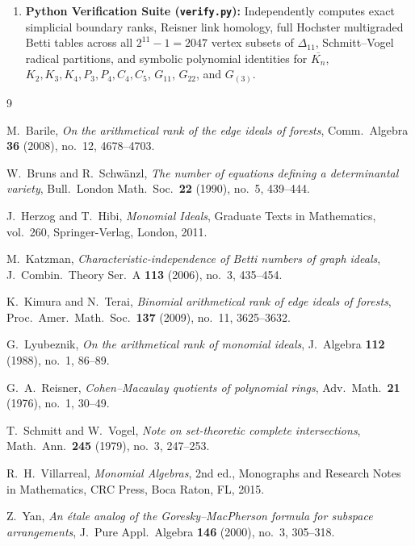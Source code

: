 \documentclass[11pt,a4paper]{amsart}
\theoremstyle{plain}
\theoremstyle{definition}
\newcommand{\FF}{\mathbb{F}}
\begin{document}
{\begin{enumerate}
\begin{itemize}
\begin{itemize}
      \item \texttt{disproof\_over\_F2} (concrete field instantiation on $\FF_2$ confirming hypothesis non-vacuity).
    \end{itemize}
  \end{itemize}
  \item[(2)] \textbf{Python Verification Suite (\texttt{verify.py}):} Independently computes exact simplicial boundary ranks, Reisner link homology, full Hochster multigraded Betti tables across all $2^{11}-1 = 2047$ vertex subsets of $\Delta_{11}$, Schmitt--Vogel radical partitions, and symbolic polynomial identities for $\overline{K_n}$, $K_2, K_3, K_4, P_3, P_4, C_4, C_5$, $G_{11}$, $G_{22}$, and $G_{(3)}$.
\end{enumerate}
\par}

\begin{thebibliography}{9}

M.~Barile, \emph{On the arithmetical rank of the edge ideals of forests}, Comm.\ Algebra \textbf{36} (2008), no.~12, 4678--4703.

W.~Bruns and R.~Schw\"anzl, \emph{The number of equations defining a determinantal variety}, Bull.\ London Math.\ Soc.\ \textbf{22} (1990), no.~5, 439--444.

J.~Herzog and T.~Hibi, \emph{Monomial Ideals}, Graduate Texts in Mathematics, vol.~260, Springer-Verlag, London, 2011.

M.~Katzman, \emph{Characteristic-independence of Betti numbers of graph ideals}, J.~Combin.\ Theory Ser.~A \textbf{113} (2006), no.~3, 435--454.

K.~Kimura and N.~Terai, \emph{Binomial arithmetical rank of edge ideals of forests}, Proc.\ Amer.\ Math.\ Soc.\ \textbf{137} (2009), no.~11, 3625--3632.

G.~Lyubeznik, \emph{On the arithmetical rank of monomial ideals}, J.~Algebra \textbf{112} (1988), no.~1, 86--89.

G.~A.~Reisner, \emph{Cohen--Macaulay quotients of polynomial rings}, Adv.\ Math.\ \textbf{21} (1976), no.~1, 30--49.

T.~Schmitt and W.~Vogel, \emph{Note on set-theoretic complete intersections}, Math.\ Ann.\ \textbf{245} (1979), no.~3, 247--253.

R.~H.~Villarreal, \emph{Monomial Algebras}, 2nd ed., Monographs and Research Notes in Mathematics, CRC Press, Boca Raton, FL, 2015.

Z.~Yan, \emph{An \'etale analog of the Goresky--MacPherson formula for subspace arrangements}, J.~Pure Appl.\ Algebra \textbf{146} (2000), no.~3, 305--318.

\end{thebibliography}
\end{document}
